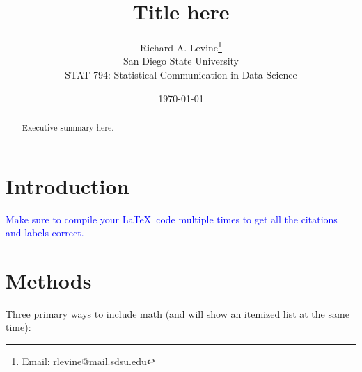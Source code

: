 \documentclass[11pt]{article}
\begin{document}
\title{Title here}
\author{Richard A. Levine\thanks{Email: rlevine@mail.sdsu.edu} \\
San Diego State University \\ STAT 794: Statistical Communication in Data Science}

\date{\today}
\maketitle
\setlength{\parskip}{0in}
\begin{abstract}
\setlength{\parindent}{0in}

Executive summary here.

\end{abstract}



\section{Introduction}
\label{intro}

\textcolor{blue}{Make sure to compile your \LaTeX\ code multiple times to get all the citations and labels correct.}

\section{Methods}
\label{method}

Three primary ways to include math (and will show an itemized list at the same time): 
\end{document}
